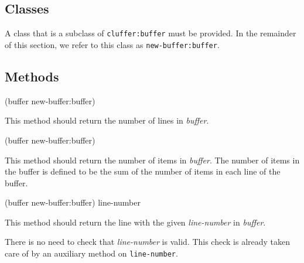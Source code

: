 \subsection{Classes}

A class that is a subclass of \texttt{cluffer:buffer} must be
provided.  In the remainder of this section, we refer to this class as
\texttt{new-buffer:buffer}.

\subsection{Methods}

 {(buffer new-buffer:buffer)}

This method should return the number of lines in \textit{buffer}.

 {(buffer new-buffer:buffer)}

This method should return the number of items in \textit{buffer}.
The number of items in the buffer is defined to be the sum of the
number of items in each line of the buffer.

 {(buffer new-buffer:buffer) line-number}

This method should return the line with the given \textit{line-number}
in \textit{buffer}.

There is no need to check that \textit{line-number} is valid.
This check is already taken care of by an auxiliary method on
\texttt{line-number}.
